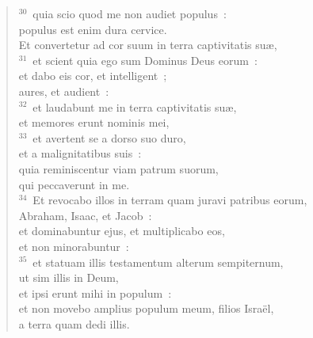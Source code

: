 \begin{verse}
${}^{30}$~quia scio quod me non audiet populus~:\\ populus est enim dura cervice.\\ Et convertetur ad cor suum in terra captivitatis su\ae ,\\
${}^{31}$~et scient quia ego sum Dominus Deus eorum~:\\ et dabo eis cor, et intelligent~;\\ aures, et audient~:\\
${}^{32}$~et laudabunt me in terra captivitatis su\ae ,\\ et memores erunt nominis mei,\\
${}^{33}$~et avertent se a dorso suo duro,\\ et a malignitatibus suis~:\\ quia reminiscentur viam patrum suorum,\\ qui peccaverunt in me.\\
${}^{34}$~Et revocabo illos in terram quam juravi patribus eorum,\\ Abraham, Isaac, et Jacob~:\\ et dominabuntur ejus, et multiplicabo eos,\\ et non minorabuntur~:\\
${}^{35}$~et statuam illis testamentum alterum sempiternum,\\ ut sim illis in Deum,\\ et ipsi erunt mihi in populum~:\\ et non movebo amplius populum meum, filios Isra\"el,\\ a terra quam dedi illis.\end{verse}


